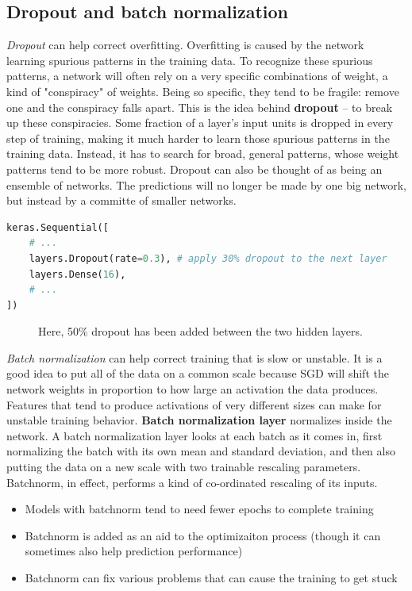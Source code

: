 \subsection{Dropout and batch normalization}
\noindent \emph{Dropout} can help correct overfitting. Overfitting is caused by the network
learning spurious patterns in the training data. To recognize these spurious patterns, a
network will often rely on a very specific combinations of weight, a kind of "conspiracy"
of weights. Being so specific, they tend to be fragile: remove one and the conspiracy falls
apart. This is the idea behind \textbf{dropout} -- to break up these conspiracies. Some
fraction of a layer's input units is dropped in every step of training, making it much harder
to learn those spurious patterns in the training data. Instead, it has to search for broad,
general patterns, whose weight patterns tend to be more robust. Dropout can also be thought
of as being an ensemble of networks. The predictions will no longer be made by one big
network, but instead by a committe of smaller networks.

\begin{lstlisting}[language=Python]
keras.Sequential([
    # ...
    layers.Dropout(rate=0.3), # apply 30% dropout to the next layer
    layers.Dense(16),
    # ...
])
\end{lstlisting}

\pagebreak

\begin{figure}[htp]
	\centering
	\caption{Here, 50\% dropout has been added between the two hidden layers.}
\end{figure}


\noindent \emph{Batch normalization} can help correct training that is slow or unstable. It
is a good idea to put all of the data on a common scale because SGD will shift the network
weights in proportion to how large an activation the data produces. Features that tend to
produce activations of very different sizes can make for unstable training behavior.
\textbf{Batch normalization layer} normalizes inside the network. A batch normalization layer
looks at each batch as it comes in, first normalizing the batch with its own mean and
standard deviation, and then also putting the data on a new scale with two trainable
rescaling parameters. Batchnorm, in effect, performs a kind of co-ordinated rescaling of its
inputs. 
\begin{itemize}
	\item Models with batchnorm tend to need fewer epochs to complete training
	\item Batchnorm is added as an aid to the optimizaiton process (though it can
		sometimes also help prediction performance)
	\item Batchnorm can fix various problems that can cause the training to get stuck
\end{itemize}

